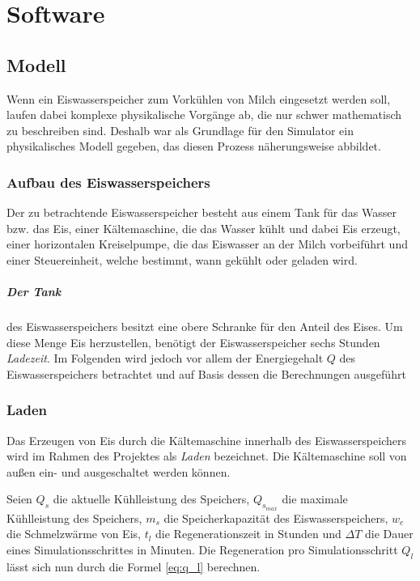 \chapter{Software}

\section{Modell}
\label{software_model}

Wenn ein Eiswasserspeicher zum Vorkühlen von Milch eingesetzt werden soll, laufen dabei komplexe physikalische Vorgänge ab, die nur schwer mathematisch zu beschreiben sind. Deshalb war als Grundlage für den Simulator ein physikalisches Modell gegeben, das diesen Prozess näherungsweise abbildet.

\subsection{Aufbau des Eiswasserspeichers}
Der zu betrachtende Eiswasserspeicher besteht aus einem Tank für das Wasser bzw. das Eis, einer Kältemaschine, die das Wasser kühlt und dabei Eis erzeugt, einer horizontalen Kreiselpumpe, die das Eiswasser an der Milch vorbeiführt und einer Steuereinheit, welche bestimmt, wann gekühlt oder geladen wird.

\paragraph{Der Tank} des Eiswasserspeichers besitzt eine obere Schranke für den Anteil des Eises. Um diese Menge Eis herzustellen, benötigt der Eiswasserspeicher sechs Stunden \emph{Ladezeit}. Im Folgenden wird jedoch vor allem der Energiegehalt $ Q $ des Eiswasserspeichers betrachtet und auf Basis dessen die Berechnungen ausgeführt

\subsection{Laden}
Das Erzeugen von Eis durch die Kältemaschine innerhalb des Eiswasserspeichers wird im Rahmen des Projektes als \emph{Laden} bezeichnet. Die Kältemaschine soll von außen ein- und ausgeschaltet werden können.

Seien $ Q_s $ die aktuelle Kühlleistung des Speichers, $ Q_{s_{max}} $ die maximale Kühlleistung des Speichers, $ m_s $ die Speicherkapazität des Eiswasserspeichers, $ w_e $ die Schmelzwärme von Eis, $ t_l $ die Regenerationszeit in Stunden und $ \Delta T $ die Dauer eines Simulationsschrittes in Minuten. Die Regeneration pro Simulationsschritt $ Q_l $ lässt sich nun durch die Formel \ref{eq:q_l} berechnen.

